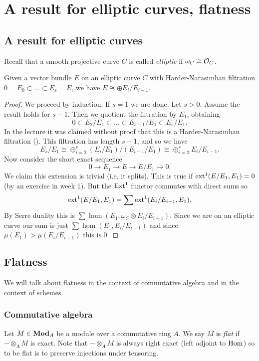 \chapter{A result for elliptic curves, flatness}

\section{A result for elliptic curves}
Recall that a smooth projective curve $C$ is called \emph{elliptic} if $\omega_C \cong \mathcal{O}_C$. 
\begin{proposition}
	Given a vector bundle $E$ on an elliptic curve $C$ with Harder-Narasimhan filtration $0 = E_0 \subset \dots \subset E_s = E$, we have $E \cong \oplus E_i/E_{i-1}$. 
\end{proposition}
\begin{proof}
	We proceed by induction. If $s = 1$ we are done. 
	Let $s > 0$. Assume the result holds for $s-1$. Then we quotient the filtration by $E_1$, obtaining \[
    	0 \subset E_2/E_1 \subset \dots \subset E_{s-1}/E_1 \subset E_s/E_1.
    \] In the lecture it was claimed without proof that this is a Harder-Narasimhan filtration (). This filtration has length $s-1$, and so we have \[E_s/E_1 \cong \oplus^s_{i=2} (E_i/E_1)/(E_{i-1}/E_1) \cong \oplus^s_{i=2} E_i/E_{i-1}.\]
	Now consider the short exact sequence \[
    	0 \to E_1 \to E \to E/E_1 \to 0.
    \] We claim this extension is trivial (i.e. it splits). This is true if $\operatorname{ext}^1(E/E_1, E_1) = 0$ (by an exercise in week 1). But the $\operatorname{Ext}^1$ functor commutes with direct sums so \[
    	\operatorname{ext}^1(E/E_1, E_1) = \sum \operatorname{ext}^1(E_i/E_{i-1}, E_1).
    \] By Serre duality  this is $\sum \hom(E_1, \omega_C \otimes E_i/E_{i-1})$. Since we are on an elliptic curve our sum is just $\sum \hom(E_1, E_i/E_{i-1})$ and since $\mu(E_1) > \mu(E_i/E_{i-1})$ this is $0$.
\end{proof}
\section{Flatness}
We will talk about flatness in the context of commutative algebra and in the context of schemes. 

\subsection{Commutative algebra}
\begin{definition}\label{def:flatness}
	Let $M \in \mathbf{Mod}_A$ be a module over a commutative ring $A$. We say $M$ is \emph{flat} if $-\otimes_A M$ is exact. Note that $-\otimes_A M$ is always right exact (left adjoint to $\operatorname{Hom}$) so to be flat is to preserve injections under tensoring.
\end{definition}

